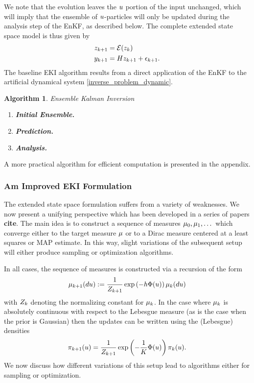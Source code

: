 \documentclass[12pt]{article}
\newtheorem{alg}{Algorithm}
\begin{document}
We note that the evolution leaves the $\spar$ portion of the input unchanged, which will imply that the ensemble of $\spar$-particles will 
only be updated during the analysis step of the EnKF, as described below. The complete extended state space
model is thus given by 
\begin{align}
\dexState[\timeStep+1] &= \mathcal{E}(\dexState[\timeStep]) \label{inverse_problem_dynamic} \\
\indexTimeStep[\timeStep+1]{\dataObs} &= \obsOpLin \dexState[\timeStep+1] + \indexTimeStep[\timeStep+1]{\noise} \nonumber.
\end{align}
The baseline EKI algorithm results from a direct application of the EnKF to the artificial dynamical system \ref{inverse_problem_dynamic}. 
\begin{alg} Ensemble Kalman Inversion \\
\begin{enumerate}
\item \textbf{Initial Ensemble.}  
\item \textbf{Prediction.}
\item \textbf{Analysis.} 
\end{enumerate}
\end{alg}
A more practical algorithm for efficient computation is presented in the appendix. 

\subsubsection{Am Improved EKI Formulation}
The extended state space formulation suffers from a variety of weaknesses. We now present a unifying perspective which has been developed 
in a series of papers \textbf{cite}. The main idea is to construct a sequence of measures $\postMeas_0, \postMeas_1, \dots$ which converge either 
to the target measure $\postMeas$ or to a Dirac measure centered at a least squares or MAP estimate. In this way, slight variations of the subsequent
setup will either produce sampling or optimization algorithms. 

In all cases, the sequence of measures is constructed via a recursion of the form 
\begin{align} 
\postMeas_{\timeStep+1}(d\spar) := \frac{1}{Z_{\timeStep+1}} \exp\left(-h \SSR(\spar) \right) \postMeas_{\timeStep}(d\spar) \label{measure_recursion}
\end{align}
with $Z_{\timeStep}$ denoting the normalizing constant for $\postMeas_{\timeStep}$. In the case where $\postMeas_{\timeStep}$ 
is absolutely continuous with respect to the Lebesgue measure (as is the case 
when the prior is Gaussian) then the updates can be written using the (Lebesgue) densities
\begin{align}
\postDens_{\timeStep+1}(\spar) = \frac{1}{Z_{\timeStep+1}} \exp\left(-\frac{1}{\Ntimestep} \SSR(\spar) \right) \postDens_{\timeStep}(\spar). 
\end{align}
We now discuss how different variations of this setup lead to algorithms either for sampling or optimization. 
\end{document}
